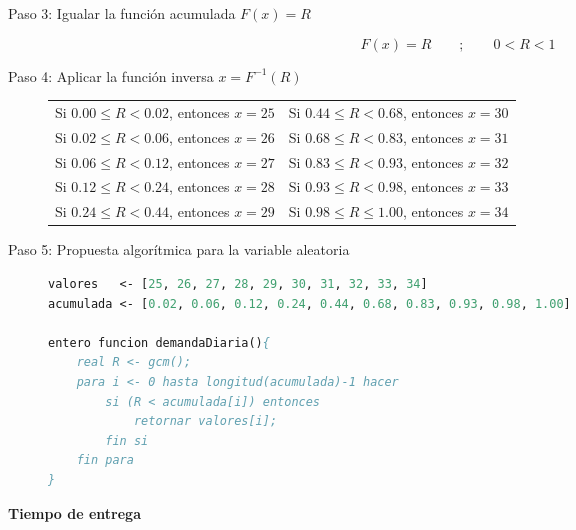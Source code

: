 \documentclass[12pt, a4paper]{article}
\begin{document}
\begin{description}
    \item[Paso 3: Igualar la función acumulada $F(x) = R$]

    $$ F(x)=R \qquad ; \qquad 0 < R < 1 $$

    \item[Paso 4: Aplicar la función inversa $x=F^{-1}(R)$]

    \begin{center}
    \begin{tabular}{ll}
    Si $0.00 \leq R < 0.02$, entonces $x=25$ & Si $0.44 \leq R < 0.68$, entonces $x=30$ \\
    Si $0.02 \leq R < 0.06$, entonces $x=26$ & Si $0.68 \leq R < 0.83$, entonces $x=31$ \\
    Si $0.06 \leq R < 0.12$, entonces $x=27$ & Si $0.83 \leq R < 0.93$, entonces $x=32$ \\
    Si $0.12 \leq R < 0.24$, entonces $x=28$ & Si $0.93 \leq R < 0.98$, entonces $x=33$ \\
    Si $0.24 \leq R < 0.44$, entonces $x=29$ & Si $0.98 \leq R \leq 1.00$, entonces $x=34$ \\
    \end{tabular}
    \end{center}

    \item[Paso 5: Propuesta algorítmica para la variable aleatoria]

    \begin{lstlisting}[caption={demandaDiaria()}, language=Pascal]
valores   <- [25, 26, 27, 28, 29, 30, 31, 32, 33, 34]
acumulada <- [0.02, 0.06, 0.12, 0.24, 0.44, 0.68, 0.83, 0.93, 0.98, 1.00]

entero funcion demandaDiaria(){
    real R <- gcm();
    para i <- 0 hasta longitud(acumulada)-1 hacer
        si (R < acumulada[i]) entonces
            retornar valores[i];
        fin si
    fin para
}
    \end{lstlisting}
\end{description}

\textbf{Tiempo de entrega}
\end{document}
